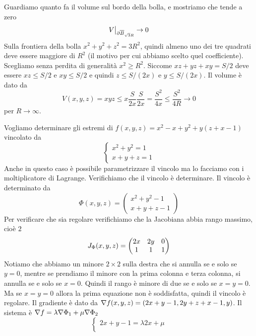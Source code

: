 \documentclass[a4paper]{article}
\begin{document}
\begin{snippetexercise}{}
    Guardiamo quanto fa il volume sul bordo della bolla, e mostriamo che tende a zero
    \[
        \restr{V}{\partial \overline{B}_{\sqrt{3}R}} \to 0
    \]
    Sulla frontiera della bolla \(x^2 + y^2 + z^2 = 3R^2\), quindi almeno uno dei tre quadrati
    deve essere maggiore di \(R^2\) (il motivo per cui abbiamo scelto quel coefficiente).
    Scegliamo senza perdita di generalità \(x^2 \geq R^2\).
    Siccome \(xz + yz + xy = S/2\) deve essere \(xz \leq S/2\) e \(xy \leq S/2\) e quindi
    \(z \leq S/(2x)\) e \(y\leq S/(2x)\). Il volume è dato da
    \[
        V(x,y,z) = xyz \leq x \frac{S}{2x} \frac{S}{2x}
        = \frac{S^2}{4x} \leq \frac{S^2}{4R} \to 0
    \]
    per \(R \to \infty\).
\end{snippetexercise}

\begin{snippetexercise}{}
    Vogliamo determinare gli estremi di \(f(x,y,z) = x^2 - x + y^2 + y(z + x - 1)\)
    vincolato da
    \[
        \begin{cases}
            x^2 + y^2 = 1 \\
            x + y + z = 1
        \end{cases}
    \]
    Anche in questo caso è possibile parametrizzare il vincolo ma lo facciamo con i
    moltiplicatore di Lagrange.
    Verifichiamo che il vincolo è determinare. Il vincolo è determinato da
    \[
        \Phi(x,y,z) = \begin{pmatrix}
            x^2 + y^2 - 1 \\
            x + y + z - 1
        \end{pmatrix}
    \]
    Per verificare che sia regolare verifichiamo che la Jacobiana abbia rango massimo, cioè \(2\)
    \[
        J_\Phi(x,y,z) = \begin{pmatrix}
            2x & 2y & 0 \\
            1 & 1 & 1
        \end{pmatrix}
    \]
    Notiamo che abbiamo un minore \(2\times 2\) sulla destra che si annulla
    se e solo se \(y=0\), mentre se prendiamo il minore con la prima colonna e  terza colonna,
    si annulla se e solo se \(x=0\).
    Quindi il rango è minore di due se e solo se \(x=y=0\).
    Ma se \(x=y=0\) allora la prima equazione non è soddisfatta, quindi il vincolo è regolare.
    Il gradiente è dato da \(\nabla f(x,y,z) = (2x + y - 1, 2y + z + x - 1, y)\).
    Il sistema è \(\nabla f = \lambda \nabla \Phi_1 + \mu \nabla \Phi_2\)
    \[
        \begin{cases}
            2x + y - 1 = \lambda 2x + \mu \\

\end{cases}\]
\end{snippetexercise}
\end{document}
